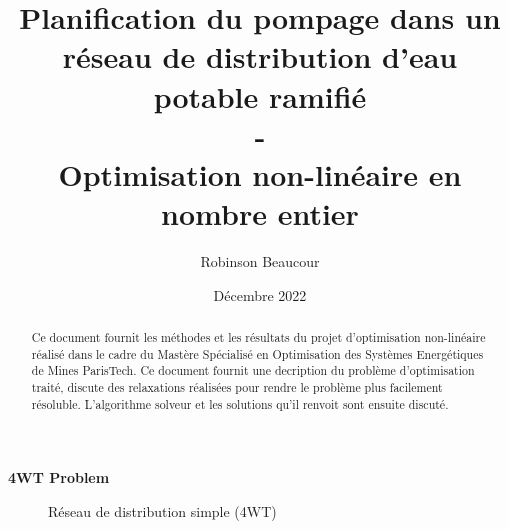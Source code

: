 \documentclass{article}
\title{Planification du pompage dans un réseau de distribution d'eau potable ramifié\\-\\Optimisation non-linéaire en nombre entier}
\author{Robinson Beaucour}
\date{Décembre 2022}
\begin{document}
\maketitle

\vspace{2cm}

\begin{abstract}
    Ce document fournit les méthodes et les résultats du projet d'optimisation non-linéaire réalisé dans le cadre du Mastère Spécialisé en Optimisation des Systèmes Energétiques de Mines ParisTech.
    Ce document fournit une decription du problème d'optimisation traité, discute des relaxations réalisées pour rendre le problème plus facilement résoluble. L'algorithme solveur et les solutions qu'il renvoit sont ensuite discuté.
\end{abstract}


\clearpage  

\begin{center}
    \large \textbf{4WT Problem}
\end{center}
\begin{figure}[h]
    \centering
    \caption{Réseau de distribution simple (4WT)}
\end{figure}
\end{document}
